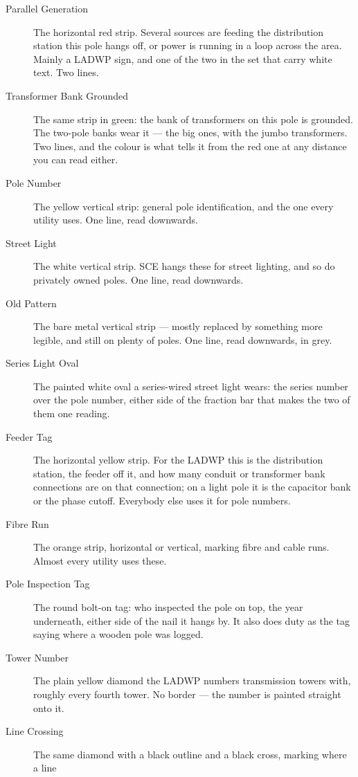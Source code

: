 \begin{description}
\item[Parallel Generation] The horizontal red strip. Several sources are feeding the distribution
      station this pole hangs off, or power is running in a loop across the area. Mainly a LADWP
      sign, and one of the two in the set that carry white text. Two lines.
\item[Transformer Bank Grounded] The same strip in green: the bank of transformers on this pole is
      grounded. The two-pole banks wear it --- the big ones, with the jumbo transformers. Two lines,
      and the colour is what tells it from the red one at any distance you can read either.
\item[Pole Number] The yellow vertical strip: general pole identification, and the one every
      utility uses. One line, read downwards.
\item[Street Light] The white vertical strip. SCE hangs these for street lighting, and so do
      privately owned poles. One line, read downwards.
\item[Old Pattern] The bare metal vertical strip --- mostly replaced by something more legible, and
      still on plenty of poles. One line, read downwards, in grey.
\item[Series Light Oval] The painted white oval a series-wired street light wears: the series number
      over the pole number, either side of the fraction bar that makes the two of them one reading.
\item[Feeder Tag] The horizontal yellow strip. For the LADWP this is the distribution station, the
      feeder off it, and how many conduit or transformer bank connections are on that connection;
      on a light pole it is the capacitor bank or the phase cutoff. Everybody else uses it for pole
      numbers.
\item[Fibre Run] The orange strip, horizontal or vertical, marking fibre and cable runs. Almost
      every utility uses these.
\item[Pole Inspection Tag] The round bolt-on tag: who inspected the pole on top, the year
      underneath, either side of the nail it hangs by. It also does duty as the tag saying
      where a wooden pole was logged.
\item[Tower Number] The plain yellow diamond the LADWP numbers transmission towers with, roughly
      every fourth tower. No border --- the number is painted straight onto it.
\item[Line Crossing] The same diamond with a black outline and a black cross, marking where a line

\end{description}
